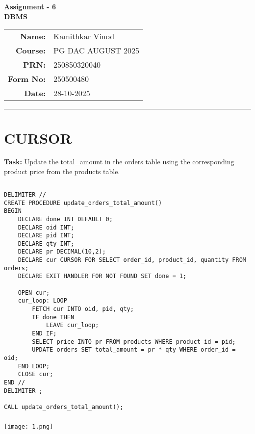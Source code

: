 \documentclass[12pt,a4paper]{article}
\begin{document}
\begin{center}
    \LARGE \textbf{Assignment - 6} \\[0.5cm]
    \Large \textbf{DBMS} \\[1cm]

    \begin{tabular}{rl}
        \textbf{Name:} & Kamithkar Vinod \\
        \textbf{Course:} & PG DAC AUGUST 2025 \\
        \textbf{PRN:} & 250850320040 \\
        \textbf{Form No:} & 250500480 \\
        \textbf{Date:} & 28-10-2025 \\
    \end{tabular}
\end{center}

\vspace{1cm}
\hrule
\vspace{0.5cm}


\section{CURSOR}
\textbf{Task:} Update the total_amount in the orders table using the corresponding
product price from the products table.

\subsection{}
\begin{lstlisting}
DELIMITER //
CREATE PROCEDURE update_orders_total_amount()
BEGIN
    DECLARE done INT DEFAULT 0;
    DECLARE oid INT;
    DECLARE pid INT;
    DECLARE qty INT;
    DECLARE pr DECIMAL(10,2);
    DECLARE cur CURSOR FOR SELECT order_id, product_id, quantity FROM orders;
    DECLARE EXIT HANDLER FOR NOT FOUND SET done = 1;

    OPEN cur;
    cur_loop: LOOP
        FETCH cur INTO oid, pid, qty;
        IF done THEN
            LEAVE cur_loop;
        END IF;
        SELECT price INTO pr FROM products WHERE product_id = pid;
        UPDATE orders SET total_amount = pr * qty WHERE order_id = oid;
    END LOOP;
    CLOSE cur;
END //
DELIMITER ;

CALL update_orders_total_amount();

\end{lstlisting}

\subsubsection{}
\begin{center}
    \texttt{[image: 1.png]}
\end{center}
\end{document}
